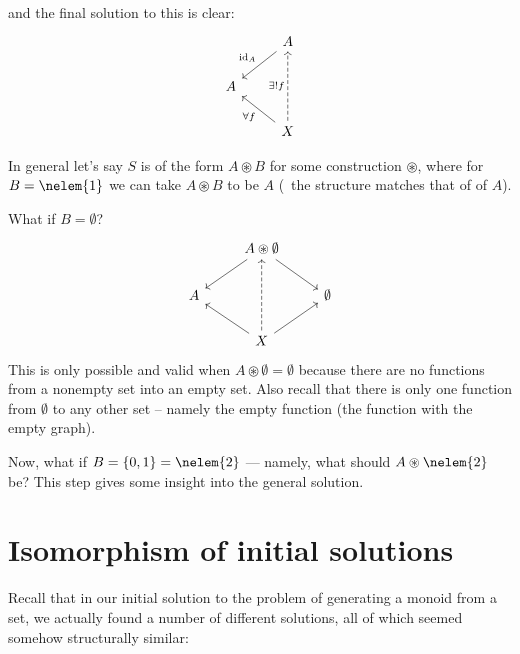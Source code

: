 and the final solution to this is clear:
$$
\begin{tikzcd}
    {} & A \arrow[ld, swap, "\id{A}"] \\
    A
    & {} \\
    {} & X \arrow[uu, dashed, "\exists! f"] \arrow[lu, "\forall f"]
\end{tikzcd}
$$

In general let's say $S$ is of the form $A \circledast B$ for some
construction $\circledast$, where for $B = \nelem{1}$ we can take
$A \circledast B$ to be $A$ (\ie~the structure matches that of of $A$).

What if $B = \emptyset$?
$$
\begin{tikzcd}
    {} & A \circledast \emptyset \arrow[ld] \arrow[rd] & {} \\
    A
    & {}
    &
    \emptyset
    \\
    {} & X \arrow[uu, dashed] \arrow[lu] \arrow[ru] & {}
\end{tikzcd}
$$
This is only possible and valid when $A \circledast \emptyset = \emptyset$
because there are no functions from a nonempty set into an empty set. Also
recall that there is only one function from $\emptyset$ to any other set --
namely the empty function (the function with the empty graph).

Now, what if $B = \setof{0, 1} = \nelem{2}$ --- namely, what should $A
\circledast \nelem{2}$ be? This step gives some insight into the general
solution.

\section{Isomorphism of initial solutions}

Recall that in our initial solution to the problem of generating a monoid
from a set, we actually found a number of different solutions, all of which
seemed somehow structurally similar:

